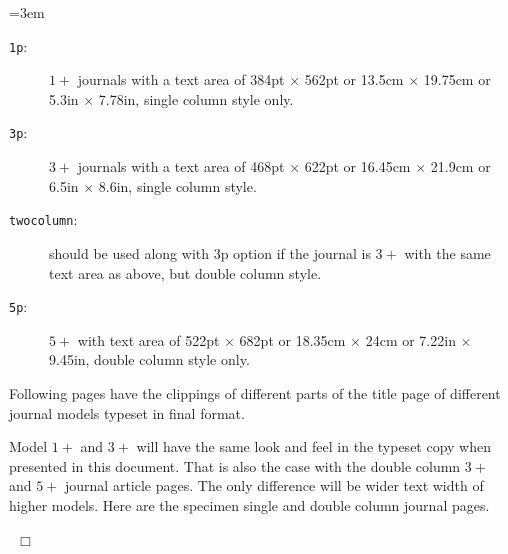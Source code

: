 \documentclass[a4paper,12pt]{article}
\begin{document}
\lmrgn=3em
\begin{description}
\item [\texttt{1p}:] $1+$ journals with a text area of
384pt $\times$ 562pt or 13.5cm $\times$ 19.75cm or 5.3in $\times$
7.78in, single column style only.

\item [\texttt{3p}:] $3+$ journals with a text area of 468pt
$\times$ 622pt or 16.45cm $\times$ 21.9cm or 6.5in $\times$
8.6in, single column style.

\item [\texttt{twocolumn}:] should be used along with 3p option if the
journal is $3+$ with the same text area as above, but double column
style. 

\item [\texttt{5p}:] $5+$ with text area of 522pt $\times$
682pt or 18.35cm $\times$ 24cm or 7.22in $\times$ 9.45in,
double column style only.
\end{description}

Following pages have the clippings of different parts of
the title page of different journal models typeset in final
format.

Model $1+$ and $3+$  will have the same look and
feel in the typeset copy when presented in this document. That is
also the case with the double column $3+$ and $5+$ journal article
pages. The only difference will be wider text width of
higher models.  Here are the specimen single and double column journal 
pages.

\vspace*{-.5pc}

\enlargethispage*{\baselineskip}

\src{}\hypertarget{sc}{}
\def\rulecolor{blue!70}
\hyperlink{bsc}{}
\def\rulecolor{orange}

\src{}\hypertarget{dc}{}
\def\rulecolor{blue!70}
\hyperlink{bsc}{}
\def\rulecolor{orange}

~\hfill $\Box$
\end{document}
